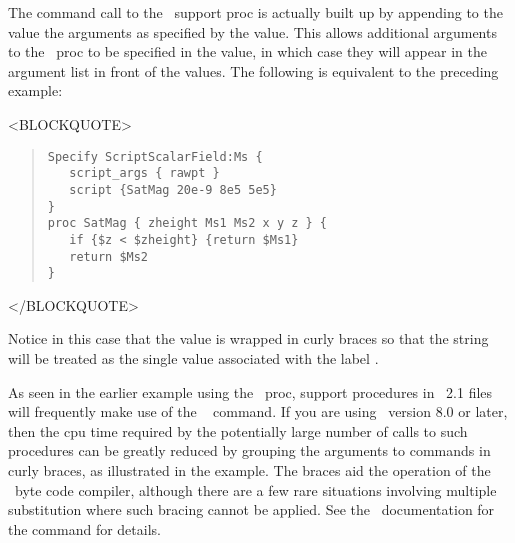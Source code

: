 The command call to the \Tcl\ support proc is actually built up by
appending to the  value the arguments as specified by the
 value.  This allows additional arguments to the
\Tcl\ proc to be specified in the  value, in which case
they will appear in the argument list in front of the
 values.  The following is equivalent to the
preceding example:
\begin{rawhtml}<BLOCKQUOTE>\end{rawhtml}
\begin{quote}
\begin{verbatim}
Specify ScriptScalarField:Ms {
   script_args { rawpt }
   script {SatMag 20e-9 8e5 5e5}
}
proc SatMag { zheight Ms1 Ms2 x y z } {
   if {$z < $zheight} {return $Ms1}
   return $Ms2
}
\end{verbatim}
\end{quote}
\begin{rawhtml}</BLOCKQUOTE>\end{rawhtml}
Notice in this case that the  value is wrapped in curly
braces so that the string  will be treated as
the single value associated with the label .

As seen in the earlier example using the  \Tcl\ proc,
support procedures in \MIF~2.1 files will frequently make use of the
\Tcl\  command.  If you are using \Tcl\ version 8.0 or later,
then the cpu time required by the potentially large number of calls to
such procedures can be greatly reduced by grouping the arguments to
 commands in curly braces, as illustrated in the
 example.  The braces aid the operation of the \Tcl\
byte code compiler, although there are a few rare situations involving
multiple substitution where such bracing cannot be applied.  See the
\Tcl\ documentation for the \cd{expr} command for details.

